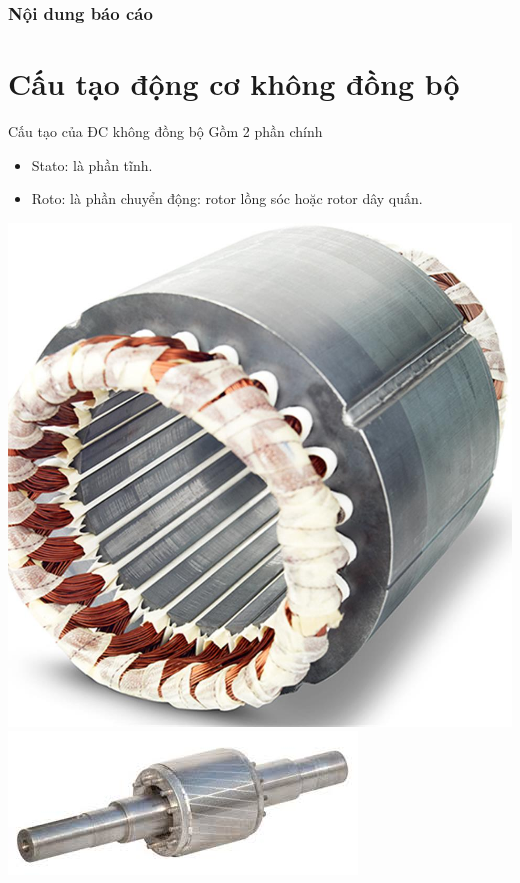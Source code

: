 \documentclass[17pt]{beamer}
\begin{document}
\begin{frame}	%
\frametitle{Nội dung báo cáo}
\tableofcontents
\end{frame}
\setcounter{framenumber}{0}

\section[Cấu tạo động cơ]{Cấu tạo động cơ không đồng bộ}
\begin{frame}[t]{Cấu tạo của ĐC không đồng bộ}
Gồm 2 phần chính
\begin{itemize}
\item Stato: là phần tĩnh.
\item Roto: là phần chuyển động: rotor lồng sóc hoặc rotor dây quấn.
\end{itemize}
\begin{center}
\includegraphics[scale=.1]{images-chude1/stator-1.jpg} 
\includegraphics[scale=.3]{images-chude1/roto-long-soc.jpg}

\end{center}
\end{frame}
\end{document}
